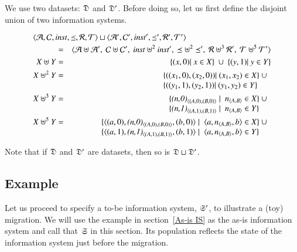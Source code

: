 \documentclass{elsarticle}
\begin{document}
	We use two datasets: $\mathfrak{D}$ and $\mathfrak{D}'$.
	Before doing so, let us first define the disjoint union of two information systems.
\begin{definition}
\begin{eqnarray}
	\omit\rlap{$\la\atoms,\concepts,\inst,\isa,\rels,\triples\ra\sqcup\la\atoms',\concepts',\inst',\isa',\rels',\triples'\ra$}\notag\\
	&=&\la\atoms\uplus\atoms',\ \concepts\uplus\concepts',\ \inst\uplus^2\inst',\ \isa\uplus^2\isa',\ \rels\uplus^3\rels',\ \triples\uplus^5\triples'\ra\notag\\
		X\uplus Y&=&\{(x,0)|\ x\in X\}\ \cup\ \{(y,1)|\ y\in Y\}\\
		X\uplus^2 Y&=&\begin{array}[t]{@{}l}\{((x_1,0),(x_2,0))|\ (x_1,x_2)\in X\}\ \cup\\ \{((y_1,1),(y_2,1))|\ (y_1,y_2)\in Y\}\end{array}\\
		X\uplus^3 Y&=&\begin{array}[t]{@{}l}\{\declare{(n,0)}{(A,0)}{(B,0)}\mid\ \declare{n}{A}{B}\in X\}\ \cup\\ \{\declare{(n,1)}{(A,1)}{(B,1)}\mid\ \declare{n}{A}{B}\in Y\}\end{array}\\
		X\uplus^5 Y&=&\begin{array}[t]{@{}l}\{\triple{(a,0)}{\declare{(n,0)}{(A,0)}{(B,0)}}{(b,0)}\mid\ \triple{a}{\declare{n}{A}{B}}{b}\in X\}\ \cup\\ \{\triple{(a,1)}{\declare{(n,1)}{(A,1)}{(B,1)}}{(b,1)}\mid\ \triple{a}{\declare{n}{A}{B}}{b}\in Y\}\end{array}
\end{eqnarray}
\end{definition}
Note that if $\mathfrak{D}$ and $\mathfrak{D}'$ are datasets, then so is $\mathfrak{D}\sqcup\mathfrak{D}'$.

\subsection{Example}
	Let us proceed to specify a to-be information system, $\mathfrak{S}'$, to illustrate a (toy) migration.
	We will use the example in section~\ref{As-is IS} as the as-is information system
	and call that $\mathfrak{S}$ in this section.
	Its population reflects the state of the information system just before the migration.
\end{document}
